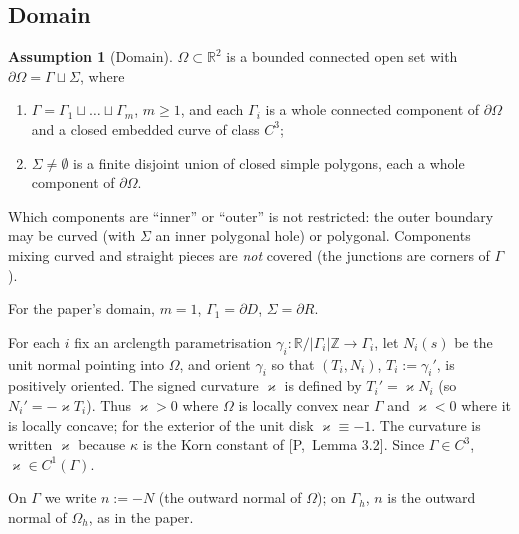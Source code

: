 \documentclass[11pt,reqno]{amsart}
\theoremstyle{plain}
\theoremstyle{definition}
\newtheorem{assumption}[theorem]{Assumption}
\newcommand{\R}{\mathbb R}
\newcommand{\Gh}{\Gamma_h}
\newcommand{\Oh}{\Omega_h}
\newcommand{\kap}{\varkappa}            %
\newcommand{\Pref}[1]{\textup{[P,~#1]}}
\begin{document}
\subsection{Domain}
\begin{assumption}[Domain]\label{gd:ass:domain}
$\Omega\subset\R^2$ is a bounded connected open set with $\partial\Omega=\Gamma\sqcup\Sigma$, where
\begin{enumerate}[label=(\alph*)]
\item $\Gamma=\Gamma_1\sqcup\dots\sqcup\Gamma_m$, $m\ge1$, and each $\Gamma_i$ is a whole connected component of $\partial\Omega$ and a closed embedded curve of class $C^3$;
\item $\Sigma\neq\emptyset$ is a finite disjoint union of closed simple polygons, each a whole component of $\partial\Omega$.
\end{enumerate}
Which components are ``inner'' or ``outer'' is not restricted: the outer boundary may be curved (with $\Sigma$ an inner polygonal hole) or polygonal. Components mixing curved and straight pieces are \emph{not} covered (the junctions are corners of $\Gamma$).
\end{assumption}
For the paper's domain, $m=1$, $\Gamma_1=\partial D$, $\Sigma=\partial R$.

For each $i$ fix an arclength parametrisation $\gamma_i:\R/|\Gamma_i|\mathbb Z\to\Gamma_i$, let $N_i(s)$ be the unit normal pointing into $\Omega$, and orient $\gamma_i$ so that $(T_i,N_i)$, $T_i:=\gamma_i'$, is positively oriented. The signed curvature $\kap$ is defined by $T_i'=\kap N_i$ (so $N_i'=-\kap T_i$). Thus $\kap>0$ where $\Omega$ is locally convex near $\Gamma$ and $\kap<0$ where it is locally concave; for the exterior of the unit disk $\kap\equiv-1$. The curvature is written $\kap$ because $\kappa$ is the Korn constant of \Pref{Lemma 3.2}. Since $\Gamma\in C^3$, $\kap\in C^1(\Gamma)$.

On $\Gamma$ we write $n:=-N$ (the outward normal of $\Omega$); on $\Gh$, $n$ is the outward normal of $\Oh$, as in the paper.
\end{document}
